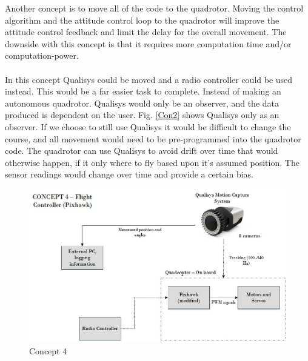 \noindent
Another concept is to move all of the code to the quadrotor. Moving the control algorithm and the attitude control loop to the quadrotor will improve the attitude control feedback and limit the delay for the overall movement. The downside with this concept is that it requires more computation time and/or computation-power. 
\\\\
In this concept Qualisys could be moved and a radio controller could be used instead. This would be a far easier task to complete. Instead of making an autonomous quadrotor. Qualisys would only be an observer, and the data produced is dependent on the user. Fig. \ref{Con2} shows Qualisys only as an observer. If we choose to still use Qualisys it would be difficult to change the course, and all movement would need to be pre-programmed into the quadrotor code. The quadrotor can use Qualisys to avoid drift over time that would otherwise happen, if it only where to fly based upon it's assumed position. The sensor readings would change over time and provide a certain bias. 

\begin{figure}[H]
          \centering
            \includegraphics[scale = 0.67]{VAPIQ-PICTURES/Concept4.jpg}
                \caption{Concept 4}
                \label{Con3}
            \label{dir}
\end{figure} 


